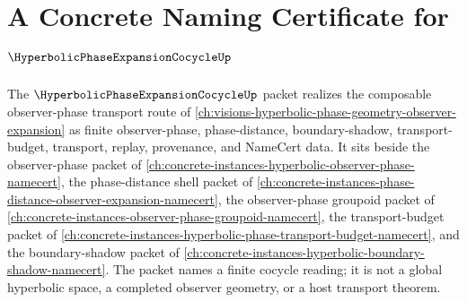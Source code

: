 \chapter{A Concrete Naming Certificate for $\HyperbolicPhaseExpansionCocycleUp$}
\label{ch:concrete-instances-hyperbolic-phase-expansion-cocycle-namecert}

The $\HyperbolicPhaseExpansionCocycleUp$ packet realizes the composable observer-phase transport route of \autoref{ch:visions-hyperbolic-phase-geometry-observer-expansion} as finite observer-phase, phase-distance, boundary-shadow, transport-budget, transport, replay, provenance, and NameCert data. It sits beside the observer-phase packet of \autoref{ch:concrete-instances-hyperbolic-observer-phase-namecert}, the phase-distance shell packet of \autoref{ch:concrete-instances-phase-distance-observer-expansion-namecert}, the observer-phase groupoid packet of \autoref{ch:concrete-instances-observer-phase-groupoid-namecert}, the transport-budget packet of \autoref{ch:concrete-instances-hyperbolic-phase-transport-budget-namecert}, and the boundary-shadow packet of \autoref{ch:concrete-instances-hyperbolic-boundary-shadow-namecert}. The packet names a finite cocycle reading; it is not a global hyperbolic space, a completed observer geometry, or a host transport theorem.

